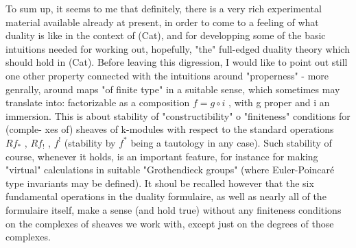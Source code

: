 To sum up, it seems to me that definitely, there is a very rich
experimental material available already at present, in order to come
to a feeling of what duality is like in the context of (Cat), and 
for developping some of the basic intuitions needed for working out,
hopefully, "the" full-edged duality theory which should hold in
(Cat). Before leaving this digression, I would like to point out still
one  other property connected with the  intuitions around
"properness" - more genrally, around maps "of finite type" in a
suitable sense, which sometimes may translate into: factorizable as
a composition $f = g\circ i$ , with g proper and i an immersion. This is about
stability of "constructibility" o "finiteness" conditions for (comple-%
xes of) sheaves of k-modules\hand{,} with respect to the standard operations
$Rf_{*}$ , $Rf_{!}$ , $f^{!}$ (stability by $f^{*}$ being a tautology in any case). Such
stability of course, whenever it holds, is an important feature,
for instance for making "virtual" calculations in suitable "Grothendieck
groups" (where Euler-Poincaré type invariants may be defined). It shoul
be recalled however that the six fundamental operations in the duality
formulaire, as well as nearly all of the formulaire itself, make a
sense (and  hold true) without any finiteness conditions on the complexes
of sheaves we work with, except just   on the degrees
of those complexes.


